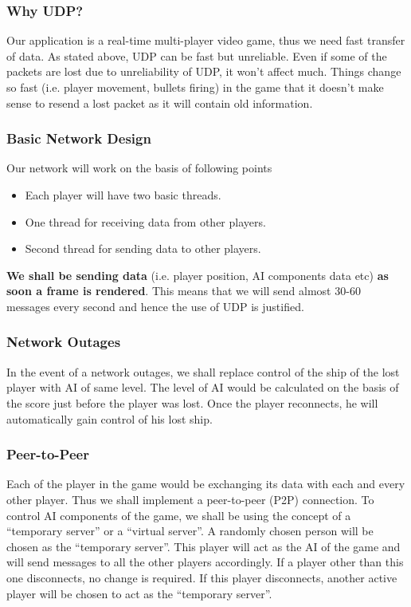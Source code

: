 \documentclass{article}
\begin{document}
				\subsubsection{Why UDP?}
					Our application is a real-time multi-player video game, thus we need fast transfer of data. As stated above, UDP can be fast but unreliable. Even if some of the packets are lost due to unreliability of UDP, it won't affect much. Things change so fast (i.e. player movement, bullets firing) in the game that it doesn't make sense to resend a lost packet as it will contain old information. 
				\subsubsection{Basic Network Design}
					Our network will work on the basis of following points
						\begin{itemize}
							\item Each player will have two basic threads.
							\item One thread for receiving data from other players.
							\item Second thread for sending data to other players.
						\end{itemize}
					\textbf{We shall be sending data} (i.e. player position, AI components data etc) \textbf{as soon a frame is rendered}. This means that we will send almost 30-60 messages every second and hence the use of UDP is justified.
				\subsubsection{Network Outages}
					In the event of a network outages, we shall replace control of the ship of the lost player with AI of same level. The level of AI would be calculated on the basis of the score just before the player was lost. Once the player reconnects, he will automatically gain control of his lost ship.
				\subsubsection{Peer-to-Peer}
					Each of the player in the game would be exchanging its data with each and every other player. Thus we shall implement a peer-to-peer (P2P) connection.
					To control AI components of the game, we shall be using the concept of a ``temporary server'' or a ``virtual server''. A randomly chosen person will be chosen as the ``temporary server''. This player will act as the AI of the game and will send messages to all the other players accordingly. If a player other than this one disconnects, no change is required. If this player disconnects, another active player will be chosen to act as the ``temporary server''.
\end{document}
